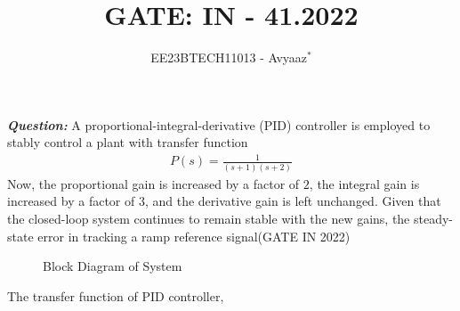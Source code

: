 \documentclass[journal,12pt,twocolumn]{IEEEtran}
\theoremstyle{remark}
\begin{document}

\vspace{3cm}

\title{GATE: IN - 41.2022}
\author{EE23BTECH11013 - Avyaaz$^{*}$%
}
\maketitle
\newpage
\bigskip

\renewcommand{\thefigure}{\arabic{figure}}
\renewcommand{\thetable}{\arabic{table}}

\large\textbf{\textsl{Question:}}
A proportional-integral-derivative (PID) controller is employed to stably control a
plant with transfer function
\begin{align}
    P(s) = \frac{1}{(s+1)(s+2)}
\end{align}
Now, the proportional gain is increased by a factor of $2$, the integral gain is
increased by a factor of $3$, and the derivative gain is left unchanged. Given that the closed-loop system continues to remain stable with the new gains, the steady-state
error in tracking a ramp reference signal\hfill(GATE IN 2022) \\
\solution

\begin{table}[htbp]
    \centering
     
    \caption{}
    \label{tab:my_label.41.IN.2022}
\end{table}

\begin{figure}[!htbp]
    \resizebox{0.501\textwidth}{!}{}
    \caption{Block Diagram of System}
    \label{fig:gate_IN_Q41_blockdiagram}
\end{figure}


The transfer function of PID controller,
\end{document}
